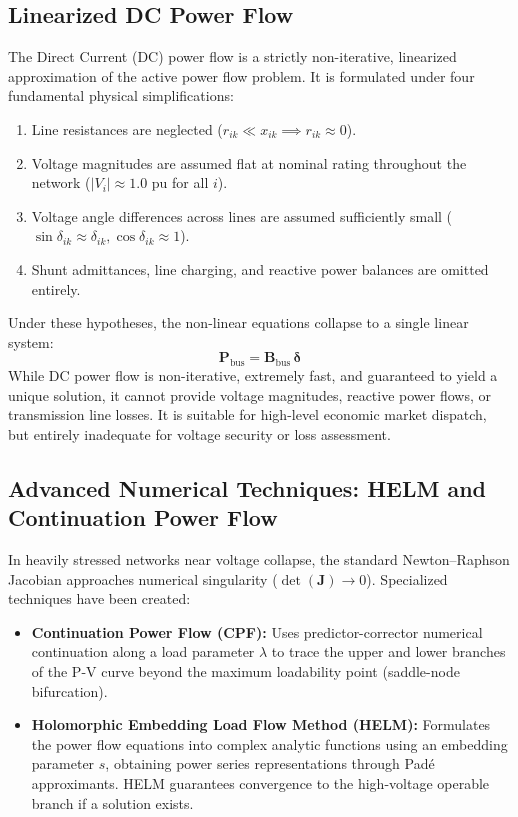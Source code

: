 \documentclass[12pt,a4paper,oneside]{report}
\begin{document}
\subsection{Linearized DC Power Flow}
The Direct Current (DC) power flow is a strictly non-iterative, linearized approximation of the active power flow problem. It is formulated under four fundamental physical simplifications:
\begin{enumerate}
    \item Line resistances are neglected ($r_{ik} \ll x_{ik} \implies r_{ik} \approx 0$).
    \item Voltage magnitudes are assumed flat at nominal rating throughout the network ($|V_i| \approx 1.0\text{ pu}$ for all $i$).
    \item Voltage angle differences across lines are assumed sufficiently small ($\sin\delta_{ik} \approx \delta_{ik}, \cos\delta_{ik} \approx 1$).
    \item Shunt admittances, line charging, and reactive power balances are omitted entirely.
\end{enumerate}
Under these hypotheses, the non-linear equations collapse to a single linear system:
\begin{equation}
\mathbf{P}_{\text{bus}} = \mathbf{B}_{\text{bus}} \, \boldsymbol{\delta}
\end{equation}
While DC power flow is non-iterative, extremely fast, and guaranteed to yield a unique solution, it cannot provide voltage magnitudes, reactive power flows, or transmission line losses. It is suitable for high-level economic market dispatch, but entirely inadequate for voltage security or loss assessment.

\subsection{Advanced Numerical Techniques: HELM and Continuation Power Flow}
In heavily stressed networks near voltage collapse, the standard Newton--Raphson Jacobian approaches numerical singularity ($\det(\mathbf{J}) \to 0$). Specialized techniques have been created:
\begin{itemize}
    \item \textbf{Continuation Power Flow (CPF):} Uses predictor-corrector numerical continuation along a load parameter $\lambda$ to trace the upper and lower branches of the P-V curve beyond the maximum loadability point (saddle-node bifurcation).
    \item \textbf{Holomorphic Embedding Load Flow Method (HELM):} Formulates the power flow equations into complex analytic functions using an embedding parameter $s$, obtaining power series representations through Pad\'e approximants. HELM guarantees convergence to the high-voltage operable branch if a solution exists.
\end{itemize}
\end{document}
